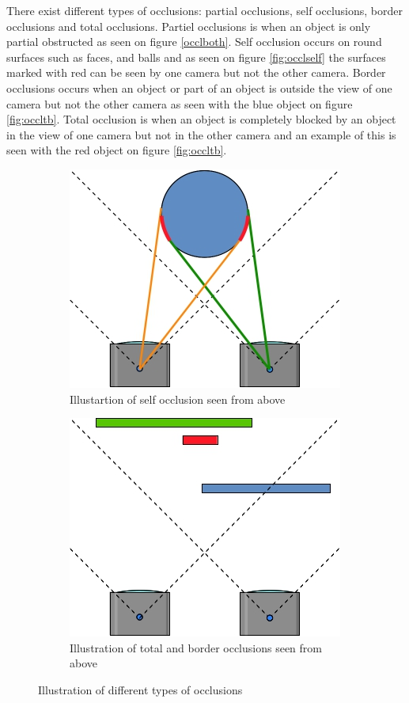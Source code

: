 There exist different types of occlusions: partial occlusions, self occlusions, border occlusions and total occlusions. Partiel occlusions is when an object is only partial obstructed as seen on figure \vref{occlboth}. Self occlusion occurs on round surfaces such as faces, and balls and as seen on figure \vref{fig:occlself} the surfaces marked with red can be seen by one camera but not the other camera. Border occlusions occurs when an object or part of an object is outside the view of one camera but not the other camera as seen with the blue object on figure \vref{fig:occltb}. Total occlusion is when an object is completely blocked by an object in the view of one camera but not in the other camera and an example of this is seen with the red object on figure \vref{fig:occltb}.\\

\begin{figure}[ht!]
  \centering
  \begin{subfigure}[t]{0.45\textwidth}
    \centering\includegraphics[scale=0.4]{figures/occlself.jpg}
    \caption{Illustartion of self occlusion seen from above\label{fig:occlself}}
  \end{subfigure}\hspace{0.5cm}
  \begin{subfigure}[t]{0.45\textwidth}
    \centering\includegraphics[scale=0.4]{figures/occltotalborder}
    \caption{Illustration of total and border occlusions seen from above\label{fig:occltb}}
  \end{subfigure}
  \caption{Illustration of different types of occlusions\label{fig:occltypes}}
\end{figure}

